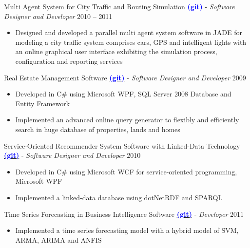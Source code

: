 \documentclass[letter]{res}
\begin{document}
\begin{resume}
Multi Agent System for City Traffic and Routing Simulation {\href{https://github.com/omid55/city_routing_model_jade_mutli_agent_system}{\textbf{\textcolor{blue}{(git)}}}} \newline
   - {\sl Software Designer and Developer} \hfill 2010 – 2011\\
   \vspace{-4mm}
   \iflong
     \begin{itemize}
        \item Designed and developed a parallel multi agent system software in JADE for modeling a city traffic system comprises cars, GPS and intelligent lights with an online graphical user interface exhibiting the simulation process, configuration and reporting services
      \end{itemize}
	\fi
    
Real Estate Management Software {\href{https://github.com/omid55/real_state_manager}{\textbf{\textcolor{blue}{(git)}}}}
\newline
- {\sl Software Designer and Developer} \hfill 2009\\
   \vspace{-4mm}
   \iflong
     \begin{itemize}
        \item Developed in C\# using Microsoft WPF, SQL Server 2008 Database and Entity Framework
        \item Implemented an advanced online query generator to flexibly and efficiently search in huge database of properties, lands and homes
     \end{itemize}
   \fi
   
Service-Oriented Recommender System Software with Linked-Data Technology {\href{https://github.com/omid55/service_oriented_linked_data_based_recommender_system}{\textbf{\textcolor{blue}{(git)}}}}
\newline
- {\sl Software Designer and Developer} \hfill 2010\\
   \vspace{-4mm}
   \iflong
     \begin{itemize}
        \item Developed in C\# using Microsoft WCF for service-oriented programming, Microsoft WPF
        \item Implemented a linked-data database using dotNetRDF and SPARQL
     \end{itemize}
   \fi

Time Series Forecasting in Business Intelligence Software {\href{https://github.com/omid55/time_series_forecasting_business_intelligence}{\textbf{\textcolor{blue}{(git)}}}}
\newline
- {\sl Developer} \hfill 2011\\
   \vspace{-4mm}
   \iflong
     \begin{itemize}
        \item Implemented a time series forecasting model with a hybrid model of SVM, ARMA, ARIMA and ANFIS
     \end{itemize}
   \fi



\end{resume}
\end{document}
